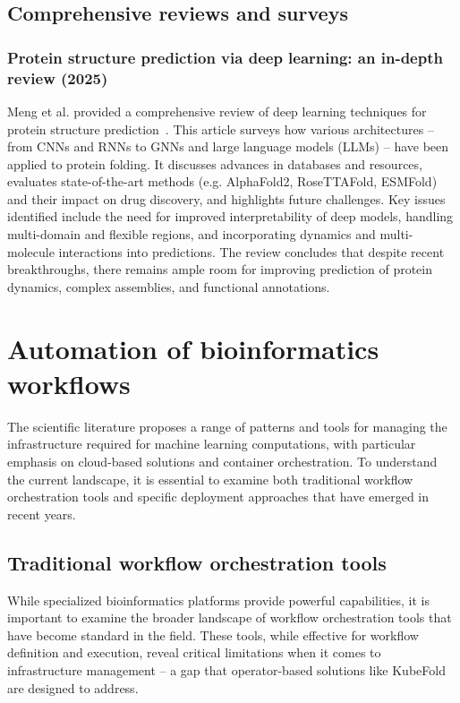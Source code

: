 \subsection{Comprehensive reviews and surveys}

\subsubsection{Protein structure prediction via deep learning: an in-depth review (2025)}

Meng et al.
provided a comprehensive review of deep learning techniques for protein structure prediction~\cite{Meng2025DeepLearningReview}.
This article surveys how various architectures – from CNNs and RNNs to GNNs and large language models (LLMs) – have been applied to protein folding.
It discusses advances in databases and resources, evaluates state-of-the-art methods (e.g. AlphaFold2, RoseTTAFold, ESMFold) and their impact on drug discovery, and highlights future challenges.
Key issues identified include the need for improved interpretability of deep models, handling multi-domain and flexible regions, and incorporating dynamics and multi-molecule interactions into predictions.
The review concludes that despite recent breakthroughs, there remains ample room for improving prediction of protein dynamics, complex assemblies, and functional annotations.


\section{Automation of bioinformatics workflows}

The scientific literature proposes a range of patterns and tools for managing the infrastructure required for machine learning computations, with particular emphasis on cloud-based solutions and container orchestration.
To understand the current landscape, it is essential to examine both traditional workflow orchestration tools and specific deployment approaches that have emerged in recent years.

\subsection{Traditional workflow orchestration tools}

While specialized bioinformatics platforms provide powerful capabilities, it is important to examine the broader landscape of workflow orchestration tools that have become standard in the field.
These tools, while effective for workflow definition and execution, reveal critical limitations when it comes to infrastructure management -- a gap that operator-based solutions like KubeFold are designed to address.

